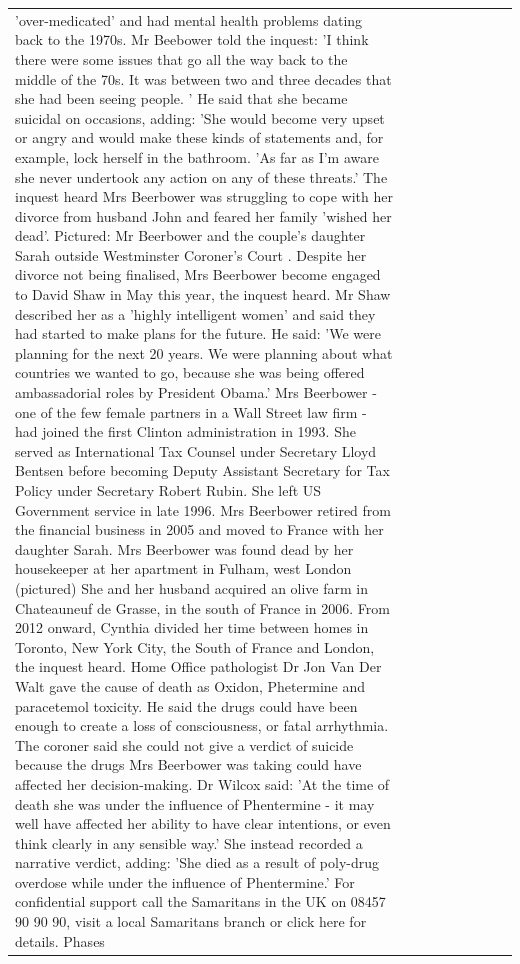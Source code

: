 \begin{table}[H]
\begin{tabular}{lllrlllll}
'over-medicated' and had mental health problems dating back to the 1970s. Mr Beebower told the inquest: 'I think there were some issues that go all the way back to the middle of the 70s. It was between two and three decades that she had been seeing people. ' He said that she became suicidal on occasions, adding: 'She would become very upset or angry and would make these kinds of statements and, for example, lock herself in the bathroom. 'As far as I'm aware she never undertook any action on any of these threats.' The inquest heard Mrs Beerbower was struggling to cope with her divorce from husband John and feared her family 'wished her dead'. Pictured: Mr Beerbower and the couple's daughter Sarah outside Westminster Coroner's Court . Despite her divorce not being finalised, Mrs Beerbower become engaged to David Shaw in May this year, the inquest heard. Mr Shaw described her as a 'highly intelligent women' and said they had started to make plans for the future. He said: 'We were planning for the next 20 years. We were planning about what countries we wanted to go, because she was being offered ambassadorial roles by President Obama.' Mrs Beerbower - one of the few female partners in a Wall Street law firm - had joined the first Clinton administration in 1993. She served as International Tax Counsel under Secretary Lloyd Bentsen before becoming Deputy Assistant Secretary for Tax Policy under Secretary Robert Rubin. She left US Government service in late 1996. Mrs Beerbower retired from the financial business in 2005 and moved to France with her daughter Sarah. Mrs Beerbower was found dead by her housekeeper at her apartment in Fulham, west London (pictured) She and her husband acquired an olive farm in Chateauneuf de Grasse, in the south of France in 2006. From 2012 onward, Cynthia divided her time between homes in Toronto, New York City, the South of France and London, the inquest heard. Home Office pathologist Dr Jon Van Der Walt gave the cause of death as Oxidon, Phetermine and paracetemol toxicity. He said the drugs could have been enough to create a loss of consciousness, or fatal arrhythmia. The coroner said she could not give a verdict of suicide because the drugs Mrs Beerbower was taking could have affected her decision-making. Dr Wilcox said: 'At the time of death she was under the influence of Phentermine - it may well have affected her ability to have clear intentions, or even think clearly in any sensible way.' She instead recorded a narrative verdict, adding: 'She died as a result of poly-drug overdose while under the influence of Phentermine.' For confidential support call the Samaritans in the UK on 08457 90 90 90, visit a local Samaritans branch or click here for details. Phases \\

\end{tabular}
\end{table}
